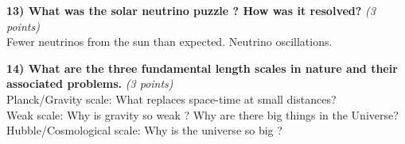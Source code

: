 {\be
{}
\ee

\textbf{13) What was the solar neutrino puzzle ? How was it resolved?  } \hfill \textit{(3 points)}\\

\bc
Fewer neutrinos from the sun than expected. 
Neutrino oscillations.
\ec


\textbf{14) What are the three fundamental length scales in nature and their associated problems.  } \hfill \textit{(3 points)}\\

\bc
Planck/Gravity scale: What replaces space-time at small distances?\\
Weak scale:  Why is gravity so weak ? Why are there big things in the Universe? \\
Hubble/Cosmological scale:  Why is the universe so big ? \\
\ec



} %

